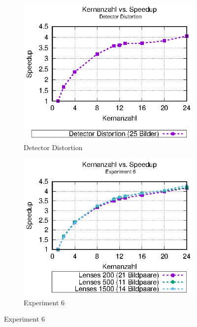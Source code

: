 \begin{center}
	\begin{figure}[htbp]
		\begin{subfigure}[b]{0.325\textwidth}
			\centering
			\includegraphics[width=\textwidth]{pdf/speedup_detector_distortion}
			\caption[Detector Distortion]{Detector Distortion}
			\label{fig:speedup_det_dist}
		\end{subfigure}
		\hfill
		\begin{subfigure}[b]{0.325\textwidth}
			\centering
			\includegraphics[width=\textwidth]{pdf/speedup_exp6}
			\caption[Experiment 6]{Experiment 6}

\end{subfigure}
\end{figure}
\end{center}
